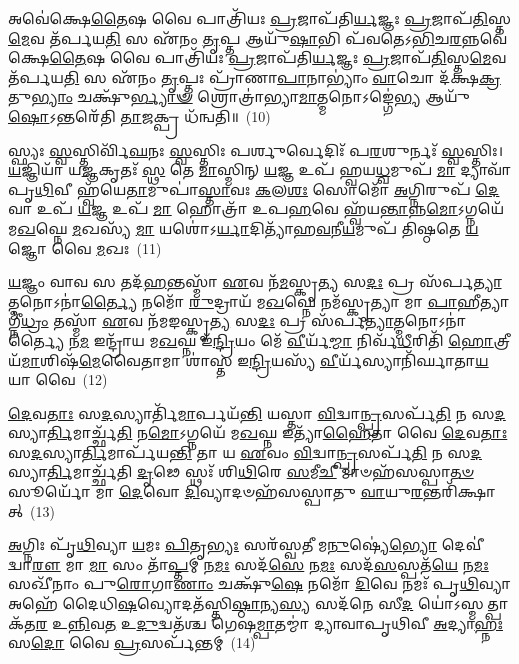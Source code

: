 𑌅𑌵𑍇॑𑌕𑍍𑌷𑍇\-\ul{𑌤𑍈}\-𑌷 𑌵𑍈 𑌪𑌾𑌤𑍍𑌰𑌿᳴𑌯𑌃 \ul{𑌪𑍍𑌰}\-𑌜𑌾𑌪᳴𑌤𑌿\-\ul{𑌰𑍍𑌯}\-𑌜𑍍𑌞𑌃 \ul{𑌪𑍍𑌰}\-𑌜𑌾𑌪᳴\-\ul{𑌤𑌿}\-𑌸𑍍𑌤\-\ul{𑌮𑍇}\-𑌵 𑌤᳴𑌰𑍍𑌪𑌯\-\ul{𑌤𑌿} 𑌸 𑌏᳴𑌨𑌂 \ul{𑌤𑍃}\-𑌪𑍍𑌤 𑌆𑌯𑍁᳴\-\ul{𑌷𑌾}\-𑌭𑌿 𑌪᳴𑌵𑌤𑍇\-𑌽\-\ul{𑌭𑌿}\-𑌚\-\ul{𑌰}\-𑌨𑍍𑌨𑌵𑍇॑𑌕𑍍𑌷𑍇\-\ul{𑌤𑍈}\-𑌷 𑌵𑍈 𑌪𑌾𑌤𑍍𑌰𑌿᳴𑌯𑌃 \ul{𑌪𑍍𑌰}\-𑌜𑌾𑌪᳴𑌤𑌿\-\ul{𑌰𑍍𑌯}\-𑌜𑍍𑌞𑌃 \ul{𑌪𑍍𑌰}\-𑌜𑌾𑌪᳴\-\ul{𑌤𑌿}\-𑌸𑍍𑌤\-\ul{𑌮𑍇}\-𑌵 𑌤᳴𑌰𑍍𑌪𑌯\-\ul{𑌤𑌿} 𑌸 𑌏᳴𑌨𑌂 \ul{𑌤𑍃}\-𑌪𑍍𑌤𑌃 𑌪𑍍𑌰𑌾᳴𑌣𑌾\-\ul{𑌪𑌾}\-𑌨𑌾\-𑌭𑍍𑌯𑌾𑌂॑ \ul{𑌵𑌾}\-𑌚𑍋 𑌦᳴𑌕𑍍𑌷\-\ul{𑌕𑍍𑌰}\-𑌤𑍁\-\ul{𑌭𑍍𑌯𑌾𑌂} 𑌚𑌕𑍍𑌷𑍁᳴\-\ul{𑌰𑍍𑌭𑍍𑌯𑌾}\-\-\ul{𑍟} 𑌶𑍍𑌰𑍋𑌤𑍍𑌰𑌾॑𑌭𑍍𑌯𑌾\-\ul{𑌮𑌾}\-𑌤𑍍𑌮𑌨𑍋\-𑌽𑌙𑍍𑌗𑍇॑\-\ul{𑌭𑍍𑌯} 𑌆𑌯𑍁᳴\-\ul{𑌷𑍋}\-\-𑌽𑌨𑍍𑌤𑌰𑍇᳴𑌤𑌿 \ul{𑌤𑌾}\-𑌜𑌕𑍍𑌪𑍍𑌰 𑌧᳴𑌨𑍍𑌵𑌤𑌿॥~(10)

{\anuvakamend[{\-\ul{𑌵𑌾}\-𑌚𑍇 \ul{𑌰𑍂}\-𑌪𑍇𑌭𑍍𑌯𑍋᳴ 𑌵\-\ul{𑌰𑍍𑌚𑍋}\-𑌦𑌾 𑌆᳴𑌮\-\ul{𑌯𑌾}\-𑌵𑍀 𑌪𑌞𑍍𑌚᳴𑌚𑌤𑍍𑌵𑌾𑌰𑌿𑍞𑌶𑌚𑍍𑌚}]}%

𑌸𑍍𑌫𑍍𑌯𑌃 \ul{𑌸𑍍𑌵}\-𑌸𑍍𑌤𑌿𑌰𑍍𑌵𑌿᳴\-\ul{𑌘}\-𑌨𑌃 \ul{𑌸𑍍𑌵}\-𑌸𑍍𑌤𑌿𑌃 𑌪𑌰𑍍\mbox{}\-\ul{𑌶𑍁}\-𑌰𑍍𑌵𑍇𑌦𑌿𑌃᳴ 𑌪\-\ul{𑌰}\-𑌶𑍁𑌰𑍍𑌨𑌃᳴ \ul{𑌸𑍍𑌵}\-𑌸𑍍𑌤𑌿𑌃। \ul{𑌯}\-𑌜𑍍𑌞𑌿𑌯𑌾᳴ 𑌯\-\ul{𑌜𑍍𑌞}\-𑌕𑍃𑌤𑌃᳴ \ul{𑌸𑍍𑌥} 𑌤𑍇 \ul{𑌮𑌾}\-𑌸𑍍𑌮𑌿𑌨𑍍 \ul{𑌯}\-𑌜𑍍𑌞 𑌉𑌪᳴ 𑌹𑍍𑌵𑌯\-\ul{𑌧𑍍𑌵}\-𑌮𑍁𑌪᳴ \ul{𑌮𑌾} 𑌦𑍍𑌯𑌾𑌵𑌾᳴𑌪𑍃\-\ul{𑌥𑌿}\-𑌵𑍀 𑌹𑍍𑌵᳴𑌯𑍇\-\ul{𑌤𑌾}\-𑌮𑍁𑌪𑌾॑\-\ul{𑌸𑍍𑌤𑌾}\-𑌵𑌃 \ul{𑌕}\-𑌲\-\ul{𑌶𑌃} 𑌸𑍋𑌮𑍋᳴ \ul{𑌅}\-𑌗𑍍𑌨𑌿𑌰𑍁𑌪᳴ \ul{𑌦𑍇}\-𑌵𑌾 𑌉𑌪᳴ \ul{𑌯}\-𑌜𑍍𑌞 𑌉𑌪᳴ \ul{𑌮𑌾} 𑌹𑍋𑌤𑍍𑌰𑌾᳴ 𑌉𑌪\-\ul{𑌹}\-𑌵𑍇 𑌹𑍍𑌵᳴𑌯\-\ul{𑌨𑍍𑌤𑌾}\-𑌨𑍍𑌨\-\ul{𑌮𑍋}\-\-𑌽𑌗𑍍𑌨𑌯𑍇᳴ 𑌮\-\ul{𑌖}\-𑌘𑍍𑌨𑍇 \ul{𑌮}\-𑌖𑌸𑍍𑌯᳴ \ul{𑌮𑌾} 𑌯𑌶𑍋॑\-𑌽\-\ul{𑌰𑍍𑌯𑌾}\-𑌦𑌿𑌤𑍍𑌯𑌾᳴𑌹\-\ul{𑌵}\-𑌨𑍀\-\ul{𑌯}\-𑌮𑍁𑌪᳴ 𑌤𑌿𑌷𑍍𑌠𑌤𑍇 \ul{𑌯}\-𑌜𑍍𑌞𑍋 𑌵𑍈 \ul{𑌮}\-𑌖𑌃~(11)

\-\ul{𑌯}\-𑌜𑍍𑌞𑌂 𑌵𑌾𑌵 𑌸 𑌤𑌦᳴\-\ul{𑌹}\-𑌨𑍍𑌤𑌸𑍍𑌮𑌾᳴ \ul{𑌏}\-𑌵 𑌨᳴\-\ul{𑌮}\-𑌸𑍍𑌕𑍃\-\ul{𑌤𑍍𑌯} 𑌸\-\ul{𑌦𑌃} 𑌪𑍍𑌰 𑌸᳴𑌰𑍍𑌪\-\ul{𑌤𑍍𑌯𑌾}\-𑌤𑍍𑌮𑌨𑍋\-𑌽𑌨𑌾॑\-\ul{𑌰𑍍𑌤𑍍𑌯𑍈} 𑌨𑌮𑍋᳴ \ul{𑌰𑍁}\-𑌦𑍍𑌰𑌾𑌯᳴ 𑌮\-\ul{𑌖}\-𑌘𑍍𑌨𑍇 𑌨𑌮᳴𑌸𑍍𑌕𑍃𑌤𑍍𑌯𑌾 𑌮𑌾 \ul{𑌪𑌾}\-𑌹𑍀𑌤𑍍𑌯𑌾𑌗𑍍𑌨𑍀॑\-\ul{𑌧𑍍𑌰𑌂} 𑌤𑌸𑍍𑌮𑌾᳴ \ul{𑌏}\-𑌵 𑌨᳴𑌮𑌙𑌸𑍍𑌕𑍃\-\ul{𑌤𑍍𑌯} 𑌸\-\ul{𑌦𑌃} 𑌪𑍍𑌰 𑌸᳴𑌰𑍍𑌪\-\ul{𑌤𑍍𑌯𑌾}\-𑌤𑍍𑌮𑌨𑍋\-𑌽𑌨𑌾॑𑌰𑍍𑌤𑍍𑌯𑍈 𑌨\-\ul{𑌮} 𑌇𑌨𑍍𑌦𑍍𑌰𑌾᳴𑌯 𑌮\-\ul{𑌖}\-𑌘𑍍𑌨 𑌇᳴\-\ul{𑌨𑍍𑌦𑍍𑌰𑌿}\-𑌯𑌂 𑌮𑍇᳴ \ul{𑌵𑍀}\-𑌰𑍍𑌯᳴\-\ul{𑌮𑍍𑌮𑌾} 𑌨𑌿𑌰𑍍𑌵᳴\-\ul{𑌧𑍀}\-𑌰𑌿𑌤𑌿᳴ \ul{𑌹𑍋}\-𑌤𑍍𑌰𑍀𑌯᳴\-\ul{𑌮𑌾}\-𑌶𑌿𑌷᳴\-\ul{𑌮𑍇}\-𑌵𑍈𑌤𑌾𑌮𑌾 𑌶𑌾॑𑌸𑍍𑌤 𑌇\-\ul{𑌨𑍍𑌦𑍍𑌰𑌿}\-𑌯𑌸𑍍𑌯᳴ \ul{𑌵𑍀}\-𑌰𑍍𑌯᳴𑌸𑍍𑌯𑌾𑌨𑌿᳴𑌰𑍍𑌘𑌾𑌤𑌾\-\ul{𑌯} 𑌯𑌾 𑌵𑍈~(12)

\-\ul{𑌦𑍇}\-𑌵\-\ul{𑌤𑌾𑌃} 𑌸\-\ul{𑌦}\-𑌸𑍍𑌯𑌾𑌰𑍍𑌤𑌿᳴\-\ul{𑌮𑌾}\-𑌰𑍍𑌪𑌯᳴\-\ul{𑌨𑍍𑌤𑌿} 𑌯𑌸𑍍𑌤𑌾 \ul{𑌵𑌿}\-𑌦𑍍𑌵𑌾\-\ul{𑌨𑍍𑌪𑍍𑌰}\-𑌸𑌰𑍍𑌪᳴\-\ul{𑌤𑌿} 𑌨 𑌸\-\ul{𑌦}\-𑌸𑍍𑌯𑌾\-\ul{𑌰𑍍𑌤𑌿}\-𑌮𑌾𑌰𑍍𑌚𑍍𑌛᳴\-\ul{𑌤𑌿} 𑌨\-\ul{𑌮𑍋}\-\-𑌽𑌗𑍍𑌨𑌯𑍇᳴ 𑌮\-\ul{𑌖}\-𑌘𑍍𑌨 𑌇𑌤𑍍𑌯𑌾᳴\-\ul{𑌹𑍈}\-𑌤𑌾 𑌵𑍈 \ul{𑌦𑍇}\-𑌵\-\ul{𑌤𑌾𑌃} 𑌸\-\ul{𑌦}\-𑌸𑍍𑌯𑌾\-\ul{𑌰𑍍𑌤𑌿}\-𑌮𑌾𑌰𑍍𑌪᳴𑌯\-\ul{𑌨𑍍𑌤𑌿} 𑌤𑌾 𑌯 \ul{𑌏}\-𑌵𑌂 \ul{𑌵𑌿}\-𑌦𑍍𑌵𑌾\-\ul{𑌨𑍍𑌪𑍍𑌰}\-𑌸𑌰𑍍𑌪᳴\-\ul{𑌤𑌿} 𑌨 𑌸\-\ul{𑌦}\-𑌸𑍍𑌯𑌾\-\ul{𑌰𑍍𑌤𑌿}\-𑌮𑌾𑌰𑍍𑌚𑍍𑌛᳴𑌤𑌿 \ul{𑌦𑍃}\-𑌢𑍇 𑌸𑍍𑌥𑌃᳴ 𑌶𑌿\-\ul{𑌥𑌿}\-𑌰𑍇 \ul{𑌸}\-𑌮𑍀\-\ul{𑌚𑍀} 𑌮𑌾𑍞𑌹᳴𑌸𑌸𑍍𑌪𑌾\-\ul{𑌤}\-\-\ul{𑍞} 𑌸𑍂𑌰𑍍𑌯𑍋᳴ 𑌮𑌾 \ul{𑌦𑍇}\-𑌵𑍋 \ul{𑌦𑌿}\-𑌵𑍍𑌯𑌾𑌦𑍞𑌹᳴𑌸𑌸𑍍𑌪𑌾𑌤𑍁 \ul{𑌵𑌾}\-𑌯𑍁\-\ul{𑌰}\-𑌨𑍍𑌤𑌰𑌿᳴𑌕𑍍𑌷𑌾𑌤𑍍~(13)

\-\ul{𑌅}\-𑌗𑍍𑌨𑌿𑌃 𑌪𑍃᳴\-\ul{𑌥𑌿}\-𑌵𑍍𑌯𑌾 \ul{𑌯}\-𑌮𑌃 \ul{𑌪𑌿}\-𑌤𑍃\-\ul{𑌭𑍍𑌯𑌃} 𑌸𑌰᳴𑌸𑍍𑌵𑌤𑍀 𑌮\-\ul{𑌨𑍁}\-𑌷𑍍𑌯𑍇॑\-\ul{𑌭𑍍𑌯𑍋} 𑌦𑍇𑌵𑍀॑ 𑌦𑍍𑌵𑌾\-\ul{𑌰𑍗} 𑌮𑌾 \ul{𑌮𑌾} 𑌸𑌂 𑌤𑌾᳴\-\ul{𑌪𑍍𑌤}\-𑌮𑍍 𑌨\-\ul{𑌮𑌃} 𑌸𑌦᳴\-\ul{𑌸𑍇} 𑌨\-\ul{𑌮𑌃} 𑌸𑌦᳴\-\ul{𑌸}\-𑌸𑍍𑌪𑌤᳴\-\ul{𑌯𑍇} 𑌨\-\ul{𑌮𑌃} 𑌸𑌖𑍀᳴𑌨𑌾𑌂 𑌪𑍁\-\ul{𑌰𑍋}\-𑌗𑌾\-\ul{𑌣𑌾𑌂} 𑌚𑌕𑍍𑌷𑍁᳴\-\ul{𑌷𑍇} 𑌨𑌮𑍋᳴ \ul{𑌦𑌿}\-𑌵𑍇 𑌨𑌮𑌃᳴ 𑌪𑍃\-\ul{𑌥𑌿}\-𑌵𑍍𑌯𑌾 𑌅𑌹𑍇᳴ 𑌦𑍈𑌧𑌿\-\ul{𑌷}\-𑌵𑍍𑌯𑍋𑌦𑌤᳴𑌸𑍍𑌤𑌿\-\ul{𑌷𑍍𑌠𑌾}\-𑌨𑍍𑌯\-\ul{𑌸𑍍𑌯} 𑌸𑌦᳴𑌨𑍇 𑌸𑍀\-\ul{𑌦} 𑌯𑍋॑\-𑌽𑌸𑍍𑌮𑌤𑍍𑌪𑌾𑌕᳴𑌤\-\ul{𑌰} 𑌉\-\ul{𑌨𑍍𑌨𑌿}\-𑌵\-\ul{𑌤} 𑌉\-\ul{𑌦𑍁}\-𑌦𑍍𑌵𑌤᳴𑌶𑍍𑌚 𑌗𑍇𑌷\-\ul{𑌮𑍍𑌪𑌾}\-𑌤𑌮𑍍𑌮𑌾॑ 𑌦𑍍𑌯𑌾𑌵𑌾𑌪𑍃𑌥𑌿𑌵𑍀 \ul{𑌅}\-𑌦𑍍𑌯𑌾\-\ul{𑌹𑍍𑌨𑌃} 𑌸\-\ul{𑌦𑍋} 𑌵𑍈 \ul{𑌪𑍍𑌰}\-𑌸𑌰𑍍𑌪᳴𑌨𑍍𑌤𑌮𑍍~(14)

